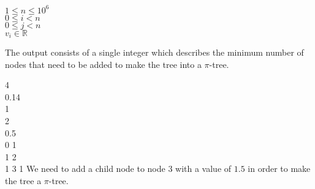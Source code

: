 \documentclass{contest-set}
\begin{document}
\pushnewpage

\constraints
$1 \leq n \leq 10^6$\\
$0 \leq i < n$\\
$0 \leq j < n$\\
$v_i \in \mathbb{R}$

\outputformat
The output consists of a single integer which describes the minimum number of nodes that need to be added to make the tree into a $\pi$-tree.



\addsampleExplanation
{
4\\
0.14\\
1\\
2\\
0.5\\
0 1\\
1 2\\
1 3
}
{
1
}
{
We need to add a child node to node $3$ with a value of $1.5$ in order to make the tree a $\pi$-tree.
}
\end{document}
